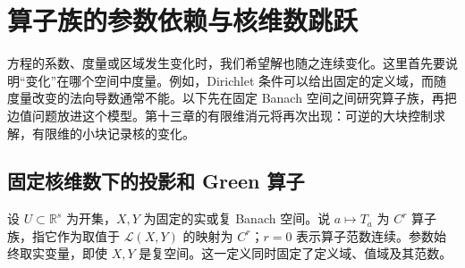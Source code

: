 
% 
% 
% 

\section{算子族的参数依赖与核维数跳跃}
\label{g3:sec:1404}

方程的系数、度量或区域发生变化时，我们希望解也随之连续变化。这里首先要说明“变化”在哪个空间中度量。例如，Dirichlet 条件可以给出固定的定义域，而随度量改变的法向导数通常不能。以下先在固定 Banach 空间之间研究算子族，再把边值问题放进这个模型。第十三章的有限维消元将再次出现：可逆的大块控制求解，有限维的小块记录核的变化。

\subsection{固定核维数下的投影和 Green 算子}
\label{g3:subsec:1404:01}
设 \(U\subset\mathbb R^s\) 为开集，\(X,Y\) 为固定的实或复 Banach 空间。说 \(a\mapsto T_a\) 为 \(C^r\) 算子族，指它作为取值于 \(\mathcal L(X,Y)\) 的映射为 \(C^r\)；\(r=0\) 表示算子范数连续。参数始终取实变量，即使 \(X,Y\) 是复空间。这一定义同时固定了定义域、值域及其范数。

